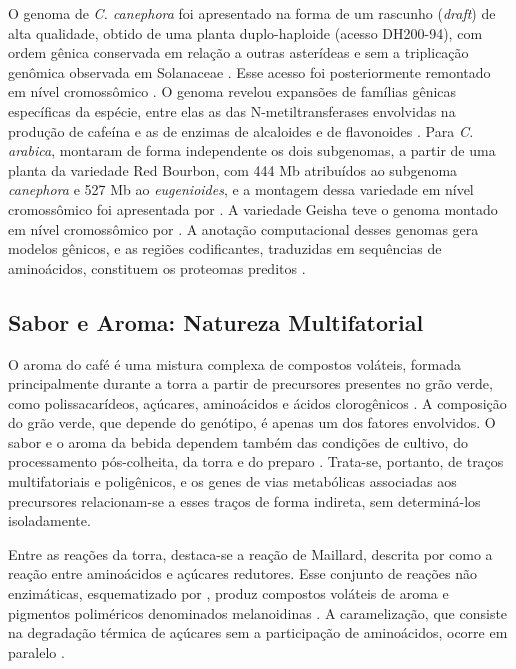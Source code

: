 O genoma de \textit{C. canephora} foi apresentado na forma de um rascunho (\textit{draft}) de alta qualidade, obtido de uma planta duplo-haploide (acesso DH200-94), com ordem gênica conservada em relação a outras asterídeas e sem a triplicação genômica observada em Solanaceae \cite{Denoeud2014}. Esse acesso foi posteriormente remontado em nível cromossômico \cite{Salojarvi2024}. O genoma revelou expansões de famílias gênicas específicas da espécie, entre elas as das N-metiltransferases envolvidas na produção de cafeína e as de enzimas de alcaloides e de flavonoides \cite{Denoeud2014}. Para \textit{C. arabica},  montaram de forma independente os dois subgenomas, a partir de uma planta da variedade Red Bourbon, com 444 Mb atribuídos ao subgenoma \textit{canephora} e 527 Mb ao \textit{eugenioides}, e a montagem dessa variedade em nível cromossômico foi apresentada por . A variedade Geisha teve o genoma montado em nível cromossômico por . A anotação computacional desses genomas gera modelos gênicos, e as regiões codificantes, traduzidas em sequências de aminoácidos, constituem os proteomas preditos \cite{Denoeud2014, Scalabrin2020}.

\subsection{Sabor e Aroma: Natureza Multifatorial}

O aroma do café é uma mistura complexa de compostos voláteis, formada principalmente durante a torra a partir de precursores presentes no grão verde, como polissacarídeos, açúcares, aminoácidos e ácidos clorogênicos \cite{Buffo2004}. A composição do grão verde, que depende do genótipo, é apenas um dos fatores envolvidos. O sabor e o aroma da bebida dependem também das condições de cultivo, do processamento pós-colheita, da torra e do preparo \cite{Buffo2004, Ludwig2014}. Trata-se, portanto, de traços multifatoriais e poligênicos, e os genes de vias metabólicas associadas aos precursores relacionam-se a esses traços de forma indireta, sem determiná-los isoladamente.

Entre as reações da torra, destaca-se a reação de Maillard, descrita por  como a reação entre aminoácidos e açúcares redutores. Esse conjunto de reações não enzimáticas, esquematizado por , produz compostos voláteis de aroma e pigmentos poliméricos denominados melanoidinas \cite{Buffo2004}. A caramelização, que consiste na degradação térmica de açúcares sem a participação de aminoácidos, ocorre em paralelo \cite{Buffo2004}.

